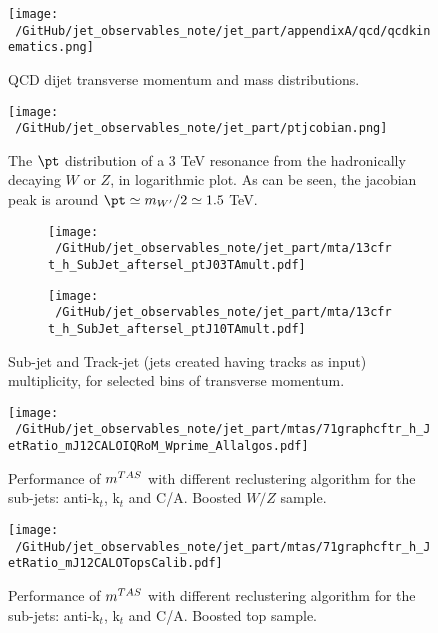 \begin{figure}
    \centering
   \texttt{[image: ~/GitHub/jet\_observables\_note/jet\_part/appendixA/qcd/qcdkinematics.png]}
   
    \caption{QCD dijet transverse momentum and mass distributions.}
    \label{fig:qcdkinematics}
\end{figure}

\begin{figure}[!ht]
  \centering
      \texttt{[image: ~/GitHub/jet\_observables\_note/jet\_part/ptjcobian.png]}
  \caption{The $\pt$ distribution of a 3 TeV resonance from the hadronically decaying $W$ or $Z$, in logarithmic plot. As can be seen, the jacobian peak is around $\pt\simeq m_{W'}/2\simeq 1.5$ TeV.}
  \label{fig:ptjacobian}
\end{figure}


\begin{figure}
    \centering
    \begin{subfigure}[b]{0.45\textwidth}
	\centering
        \texttt{[image: ~/GitHub/jet\_observables\_note/jet\_part/mta/13cfrt\_h\_SubJet\_aftersel\_ptJ03TAmult.pdf]}
 
    \end{subfigure}
    \begin{subfigure}[b]{0.45\textwidth}
	\centering
        \texttt{[image: ~/GitHub/jet\_observables\_note/jet\_part/mta/13cfrt\_h\_SubJet\_aftersel\_ptJ10TAmult.pdf]}
   
    \end{subfigure}
    \caption{Sub-jet and Track-jet (jets created having tracks as input) multiplicity, for selected bins of transverse momentum.} 
    \label{fig:multi}
\end{figure}


\begin{figure}
    \centering
   \texttt{[image: ~/GitHub/jet\_observables\_note/jet\_part/mtas/71graphcftr\_h\_JetRatio\_mJ12CALOIQRoM\_Wprime\_Allalgos.pdf]}
   
    \caption{Performance of $m^{TAS}$ with different reclustering algorithm for the sub-jets: anti-k$_t$, k$_t$ and C/A. Boosted $W/Z$ sample.}
    \label{fig:allalgow}
\end{figure}

\begin{figure}
    \centering
   \texttt{[image: ~/GitHub/jet\_observables\_note/jet\_part/mtas/71graphcftr\_h\_JetRatio\_mJ12CALOTopsCalib.pdf]}
   
    \caption{Performance of $m^{TAS}$ with different reclustering algorithm for the sub-jets: anti-k$_t$, k$_t$ and C/A. Boosted top sample.}
    \label{fig:allalgotop}
\end{figure}

